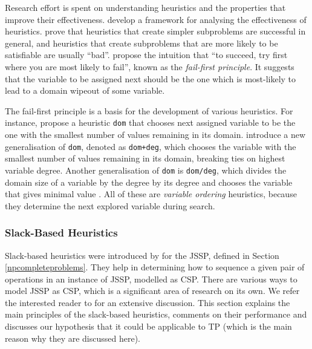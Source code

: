 \documentclass{mprop}
\theoremstyle{definition}
\begin{document}
Research effort is spent on understanding heuristics and the properties that improve their effectiveness. \citet{Christopher03} develop a framework for analysing the effectiveness of  heuristics. \citet{Hooker95} prove that heuristics that create simpler subproblems are successful in general, and heuristics that create subproblems that are more likely to be satisfiable are usually ``bad''. \citet{Haralick80} propose the intuition that ``to succeed, try first where you are most likely to fail'', known as the \textit{fail-first principle}. It suggests that the variable to be assigned next should be the one which is most-likely to lead to a domain wipeout of some variable.

The fail-first principle is a basis for the development of various heuristics. For instance, \citet{Golomb65} propose a heuristic \texttt{dom} that chooses next assigned variable to be the one with the smallest number of values remaining in its domain. \citet{Brelaz79} introduce a new generalisation of \texttt{dom}, denoted as \texttt{dom+deg}, which chooses the variable with the smallest number of values remaining in its domain, breaking ties on highest variable degree. Another generalisation of \texttt{dom} is \texttt{dom/deg}, which divides the domain size of a variable by the degree by its degree and chooses the variable that gives minimal value \citep{Bessiere96}. All of these are \textit{variable ordering} heuristics, because they determine the next explored variable during search.



\subsubsection*{Slack-Based Heuristics}

Slack-based heuristics were introduced by \citet{Smith93} for the JSSP, defined in Section \ref{npcompleteproblems}. They help in determining how to sequence a given pair of operations in an instance of JSSP, modelled as CSP. There are various ways to model JSSP as CSP, which is a significant area of research on its own. We refer the interested reader to \citet[Chapter~22]{cpbible} for an extensive discussion.
This section explains the main principles of the slack-based heuristics, comments on their performance and discusses our hypothesis that it could be applicable to TP (which is the main reason why they are discussed here).
\end{document}
